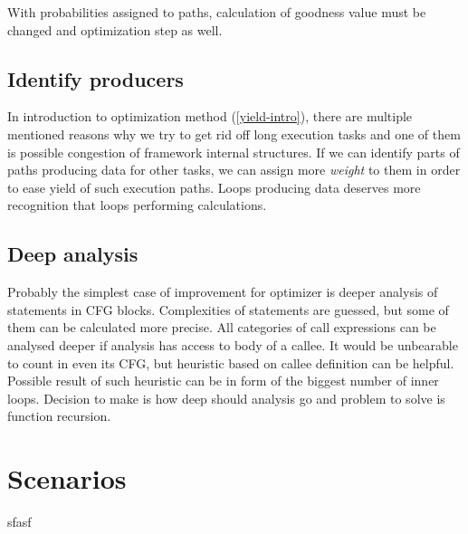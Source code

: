 With probabilities assigned to paths, calculation of goodness value must be changed and optimization step as well.

\subsection{Identify producers}
In introduction to optimization method (\ref{yield-intro}), there are multiple mentioned reasons why we try to get rid off long execution tasks and one of them is possible congestion of framework internal structures. If we can identify parts of paths producing data for other tasks, we can assign more \textit{weight} to them in order to ease yield of such execution paths. Loops producing data deserves more recognition that loops performing calculations.

\subsection{Deep analysis}
Probably the simplest case of improvement for optimizer is deeper analysis of statements in CFG blocks. Complexities of statements are guessed, but some of them can be calculated more precise. All categories of call expressions can be analysed deeper if analysis has access to body of a callee. It would be unbearable to count in even its CFG, but heuristic based on callee definition can be helpful. Possible result of such heuristic can be in form of the biggest number of inner loops. Decision to make is how deep should analysis go and problem to solve is function recursion.

\section{Scenarios}
sfasf